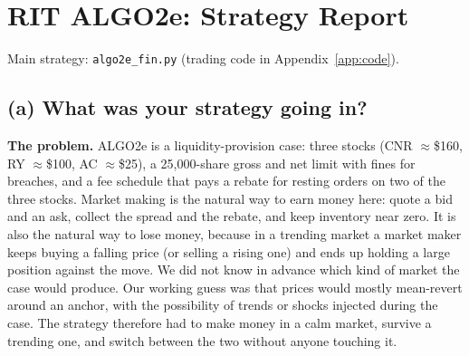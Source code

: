 \providecommand{\code}[1]{\texttt{#1}}
\section*{RIT ALGO2e: Strategy Report}
Main strategy: \code{algo2e\_fin.py} (trading code in Appendix~\ref{app:code}).


\subsection*{(a) What was your strategy going in?}

\textbf{The problem.} ALGO2e is a liquidity-provision case: three stocks (CNR $\approx$\$160, RY $\approx$\$100, AC $\approx$\$25), a 25{,}000-share gross and net
limit with fines for breaches, and a fee schedule that pays a rebate for resting orders on two of the three stocks. Market making is the natural way to earn money
here: quote a bid and an ask, collect the spread and the rebate, and keep inventory near zero. It is also the natural way to lose money, because in a trending market
a market maker keeps buying a falling price (or selling a rising one) and ends up holding a large position against the move. We did not know in advance which kind
of market the case would produce. Our working guess was that prices would mostly mean-revert around an anchor, with the possibility of trends or shocks injected during
the case. The strategy therefore had to make money in a calm market, survive a trending one, and switch between the two without anyone touching it.

